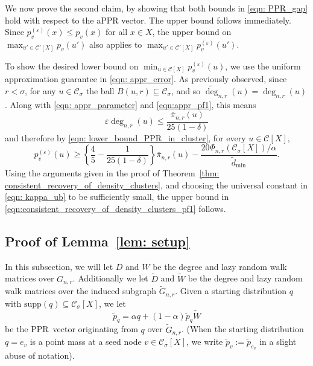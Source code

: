 \documentclass[11pt,twoside]{article}
\theoremstyle{definition}
\newcommand{\1}{\mathbbm{1}}
\newcommand{\pbf}{p}        %
\newcommand{\Xbf}{X}
\newcommand{\Wbf}{W}
\newcommand{\Dbf}{D}
\newcommand{\Cset}{\mathcal{C}}
\newcommand{\Csig}{\Cset_{\sigma}}
\newcommand{\degminwt}{\widetilde{d}_{\min}}
\newcommand{\pprspace}{{\sc PPR~}}
\begin{document}
We now prove the second claim, by showing that both bounds in \eqref{eqn: PPR_gap} hold with respect to the aPPR vector. The upper bound follows immediately. Since $p^{(\varepsilon)}_v(x) \leq p_v(x)$ for all $x \in \Xbf$, the upper bound on $\max_{u' \in \Cset'[\Xbf]} p_v(u')$ also applies to $\max_{u' \in \Cset'[\Xbf]} p^{(\varepsilon)}_v(u')$. 

To show the desired lower bound on $\min_{u \in \Cset[\Xbf]} p^{(\varepsilon)}_v(u)$, we use the uniform approximation guarantee in \eqref{eqn: appr_error}. As previously observed, since $r < \sigma$, for any $u \in \Csig$ the ball $B(u,r) \subseteq \Csig$, and so $\widetilde{\deg}_{n,r}(u) = \deg_{n,r}(u)$. Along with \eqref{eqn: appr_parameter} and \eqref{eqn:appr_pf1}, this means
\begin{equation*}
\varepsilon \deg_{n,r}(u) \leq \frac{\overline{\pi}_{n,r}(u)}{25(1 - \delta)}
\end{equation*}
and therefore by \eqref{eqn: lower_bound_PPR_in_cluster}, for every $u \in \Cset[\Xbf]$,
\begin{equation*}
p^{(\varepsilon)}_v(u) \geq \left\{\frac{4}{5} - \frac{1}{25(1 - \delta)}\right\} \overline{\pi}_{n,r}(u) - \frac{20 \Phi_{n,r}(\Csig[\Xbf])/\alpha}{\degminwt}.
\end{equation*}
\noindent Using the arguments given in the proof of Theorem~\ref{thm: consistent_recovery_of_density_clusters}, and choosing the universal constant in \eqref{eqn: kappa_ub} to be sufficiently small, the upper bound in \eqref{eqn:consistent_recovery_of_density_clusters_pf1} follows.

\subsection{Proof of Lemma~\ref{lem: setup}}

In this subsection, we will let $\Dbf$ and $\Wbf$ be the degree and lazy random walk matrices over $G_{n,r}$. Additionally we let $\widetilde{\Dbf}$ and $\widetilde{\Wbf}$ be the degree and lazy random walk matrices over the induced subgraph $\widetilde{G}_{n,r}$. Given a starting distribution $q$ with $\mathrm{supp}(q) \subseteq \Csig[\Xbf]$, we let
	\begin{equation}
	\widetilde{\pbf}_q = \alpha q + (1 - \alpha) \widetilde{\pbf}_{q} \widetilde{\Wbf}
	\end{equation}
	be the \pprspace vector originating from $q$ over $\widetilde{G}_{n,r}$. (When the starting distribution $q = e_v$ is a point mass at a seed node $v \in \Csig[\Xbf]$, we write $\widetilde{\pbf}_v := \widetilde{\pbf}_{e_v}$ in a slight abuse of notation).
	
\end{document}
